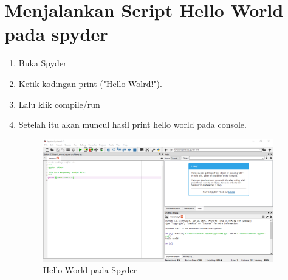     \section{Menjalankan Script Hello World pada spyder}
     \begin{enumerate}
        \item Buka Spyder
        \item Ketik kodingan print ("Hello Wolrd!").
        \item Lalu klik compile/run
        \item Setelah itu akan muncul hasil print hello world pada console.
        \begin{figure}[!htpb]
			\includegraphics[width=10cm]{figures/printhello.PNG}
			\centering
			\caption{Hello World pada Spyder}
		\end{figure}
    \end{enumerate}
    
    \newpage
    

